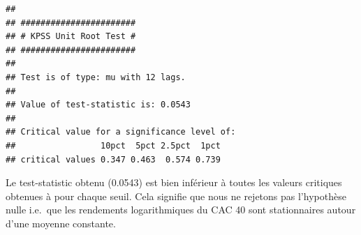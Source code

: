 \documentclass[
]{article}
\begin{document}
\begin{verbatim}
## 
## ####################### 
## # KPSS Unit Root Test # 
## ####################### 
## 
## Test is of type: mu with 12 lags. 
## 
## Value of test-statistic is: 0.0543 
## 
## Critical value for a significance level of: 
##                 10pct  5pct 2.5pct  1pct
## critical values 0.347 0.463  0.574 0.739
\end{verbatim}

Le test-statistic obtenu (0.0543) est bien inférieur à toutes les
valeurs critiques obtenues à pour chaque seuil. Cela signifie que nous
ne rejetons pas l'hypothèse nulle i.e.~que les rendements logarithmiques
du CAC 40 sont stationnaires autour d'une moyenne constante.
\end{document}
